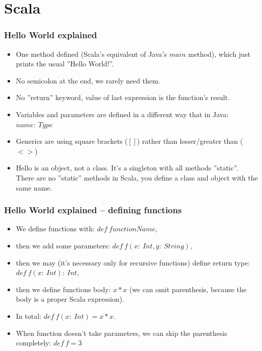 \documentclass[xcolor=dvipsnames]{beamer}
\begin{document}
\section{Scala}


\begin{frame}
\frametitle{Hello World explained}
\begin{itemize}
\item One method defined (Scala's equivalent of Java's $main$ method), which just prints the usual ''Hello World!''.
\item No semicolon at the end, we rarely need them.
\item No ''return'' keyword, value of last expression is the function's result.
\item Variables and parameters are defined in a different way that in Java: $name:\:Type$
\item Generics are using square brackets ($[]$) rather than lesser/greater than ($<>$)
\item Hello is an object, not a class. It's a singleton with all methods ''static''. There are no ''static'' methods in Scala, you define a class and object with the same name.
\end{itemize}
\end{frame}

\begin{frame}
\frametitle{Hello World explained -- defining functions}
\begin{itemize}
\item We define functions with: $def\:functionName$,
\item then we add some parameters: $def\:f(x:\:Int, y:\:String)$,
\item then we may (it's necessary only for recursive functions) define return type: $def\:f(x:\:Int):\:Int$,
\item then we define functions body: $x * x$ (we can omit parenthesis, because the body is a proper Scala expression).
\item In total: $def\:f(x:\:Int) = x * x$.
\item When function doesn't take parameters, we can skip the parenthesis completely: $def\:f = 3$
\end{itemize}
\end{frame}
\end{document}
